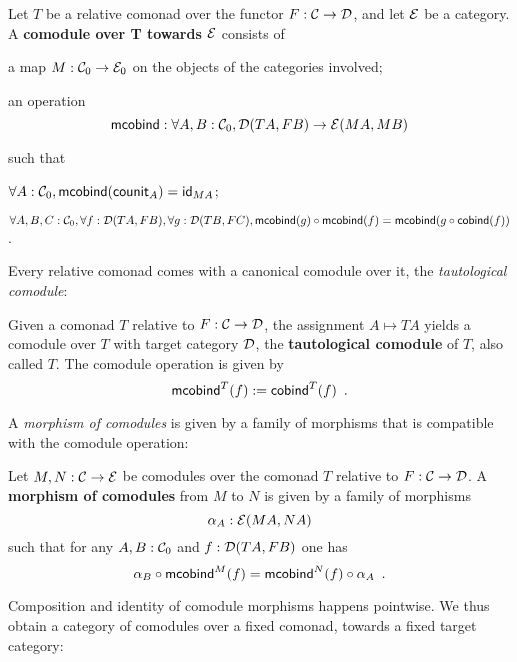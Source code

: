 \documentclass[conference,10pt]{IEEEtran}
\newcommand{\fat}[1]{\textbf{#1}}
\begin{document}
\begin{definition}\label{def:comodule}
 Let $T$ be a relative comonad over the functor $F:\C\to\D$, and let $\E$ be a category.
 A \fat{comodule over T towards $\E$} consists of
   \begin{packitem}
   \item a map $M:\C_0 \to \E_0$ on the objects of the categories involved;
   \item an operation \[\mcobind: \forall A,B:\C_0, \D(TA,FB) \to \E(MA,MB)\]
  \end{packitem}
  such that 
  \begin{packitem}
   \item $\forall A : \C_0, \mcobind(\counit_A) = \id_{MA}$;
   \item $\forall A,B,C:\C_0, \forall f : \D(TA,FB),\forall g:\D(TB,FC), \\
        \comp{\mcobind(f)}{\mcobind(g)} = \mcobind(\comp{\cobind(f)}{g})$ .
  \end{packitem}

\end{definition}

Every relative comonad comes with a canonical comodule over it, the \emph{tautological comodule}:

\begin{definition}\label{def:tautological_comodule}
  Given a comonad $T$ relative to $F:\C\to\D$, the assignment $A \mapsto TA$ yields a comodule over $T$ 
  with target category $\D$, the \textbf{tautological comodule} of $T$, also called $T$.
  The comodule operation is given by
    \[  \mcobind^T(f) := \cobind^T(f) \enspace . \]
\end{definition}


A \emph{morphism of comodules} is given by a family of morphisms that is compatible with 
the comodule operation:

\begin{definition}\label{def:morphism_of_comodules}
 Let $M, N : \C \to \E$ be comodules over the comonad $T$ relative to  $F:\C \to \D$.
 A \fat{morphism of comodules} from $M$ to $N$ is given by a family of morphisms 
   \[ \alpha_A:\E(MA,NA) \]
 such that for any $A,B:\C_0$ and $f : \D(TA,FB)$ one has
 \[   \comp{\mcobind^M(f)}{\alpha_B} = \comp{\alpha_A}{\mcobind^N(f)} \enspace . \]
\end{definition}


Composition and identity of comodule morphisms happens pointwise. We thus obtain a category of comodules
over a fixed comonad, towards a fixed target category:
\end{document}
